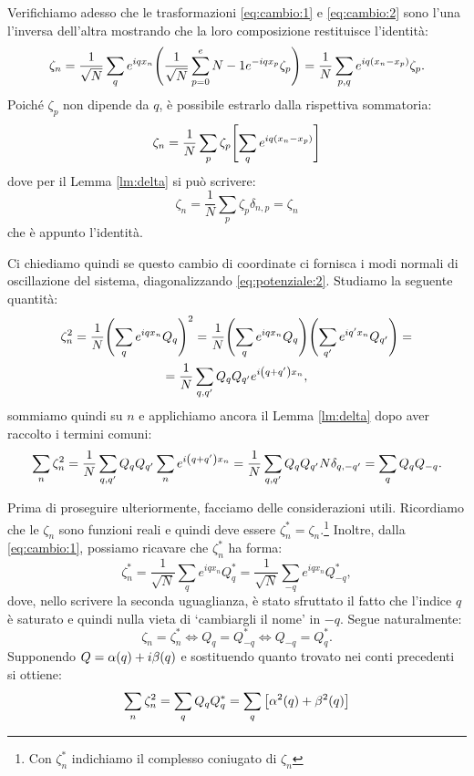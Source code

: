     \par Verifichiamo adesso che le trasformazioni \eqref{eq:cambio:1} e \eqref{eq:cambio:2} sono l'una l'inversa dell'altra mostrando che la loro composizione restituisce l'identit\`a: $$\zeta_n=\frac{1}{\sqrt{N}}\sum_{q}e^{iqx_n}\qty(\frac{1}{\sqrt{N}}\sum_{p=0}^e{N-1}e^{-iqx_p}\zeta_p)=\frac{1}{N}\sum_{p,q}e^{iq\qty(x_n-x_p)}\zeta_p.$$ Poich\'e $\zeta_p$ non dipende da $q$, \`e possibile estrarlo dalla rispettiva sommatoria: $$\zeta_n=\frac{1}{N}\sum_p\zeta_p\qty[\sum_q e^{iq\qty(x_n-x_p)}]$$ dove per il Lemma \ref{lm:delta} si pu\`o scrivere: $$\zeta_n=\frac{1}{N}\sum_p\zeta_p\delta_{n,p}=\zeta_n$$ che \`e appunto l'identit\`a. \par Ci chiediamo quindi se questo cambio di coordinate ci fornisca i modi normali di oscillazione del sistema, diagonalizzando \eqref{eq:potenziale:2}. Studiamo la seguente quantit\`a:
    \begin{multline*}
        \zeta_n^2=\frac{1}{N}\qty(\sum_q e^{iqx_n}Q_q)^2=\frac{1}{N}\qty(\sum_q e^{iqx_n}Q_q)\Biggl(\sum_{q'} e^{iq'x_n}Q_{q'}\Biggr)=\\=\frac{1}{N}\sum_{q,q'}Q_qQ_{q'}e^{i\qty(q+q')x_n},
    \end{multline*}
    sommiamo quindi su $n$ e applichiamo ancora il Lemma \ref{lm:delta} dopo aver raccolto i termini comuni: $$\sum_n\zeta_n^2=\frac{1}{N}\sum_{q,q'}Q_qQ_{q'}\sum_ne^{i\qty(q+q')x_n}=\frac{1}{N}\sum_{q,q'}Q_qQ_{q'}N\delta_{q,-q'}=\sum_qQ_qQ_{-q}.$$
    \par Prima di proseguire ulteriormente, facciamo delle considerazioni utili. Ricordiamo che le $\zeta_n$ sono funzioni reali e quindi deve essere $\zeta_n^*=\zeta_n$.\footnote{Con $\zeta_n^*$ indichiamo il complesso coniugato di $\zeta_n$} Inoltre, dalla \eqref{eq:cambio:1}, possiamo ricavare che $\zeta_n^*$ ha forma: $$\zeta_n^*=\frac{1}{\sqrt{N}}\sum_qe^{iqx_n}Q_q^*=\frac{1}{\sqrt{N}}\sum_{-q}e^{iqx_n}Q_{-q}^*,$$ dove, nello scrivere la seconda uguaglianza, \`e stato sfruttato il fatto che l'indice $q$ \`e saturato e quindi nulla vieta di `cambiargli il nome' in $-q$. Segue naturalmente:
    \begin{equation}
        \zeta_n=\zeta_n^* \iff Q_q=Q_{-q}^* \iff Q_{-q}=Q_q^*.
        \label{eq:QQ}
    \end{equation}
    Supponendo $Q=\alpha\qty(q)+i\beta\qty(q)$ e sostituendo quanto trovato nei conti precedenti si ottiene:
    \begin{equation}
        \sum_n\zeta_n^2=\sum_qQ_qQ_q^*=\sum_q\qty[\alpha^2\qty(q)+\beta^2\qty(q)]
        \label{eq:sommazetaquadro}
    \end{equation}
